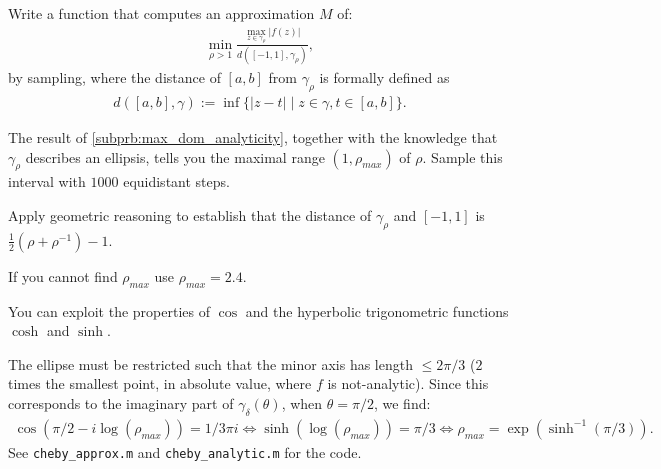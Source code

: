 \begin{problem}
\begin{subproblem}[2] \label{subprb:compute_upper_bound_cheby}
 Write a \Matlab{} function that computes an approximation $M$ of:
 \begin{align}
  \min_{\rho > 1} \frac{ \max_{z \in \gamma_\rho} \lvert f(z) \rvert }{d([-1,1], \gamma_\rho)},
 \end{align}
 by sampling, where the distance of $[a,b]$ from $\gamma_{\rho}$ is formally
 defined as
 \begin{align}
  d([a,b], \gamma) := \inf \{ \lvert z - t \rvert \; | \; z \in \gamma, t \in [a,b] \}.
 \end{align}

 \begin{hint}
  The result of \ref{subprb:max_dom_analyticity}, together with the knowledge that $\gamma_\rho$ describes an ellipsis, tells you the maximal range $(1,\rho_{max})$ of $\rho$. Sample this interval with $1000$ equidistant steps.
 \end{hint}
 
 \begin{hint}
  Apply geometric reasoning to establish that the
  distance of $\gamma_\rho$ and $[-1,1]$ is $\frac{1}{2}(\rho + \rho^{-1}) - 1$.
 \end{hint}
 
 \begin{hint}
  If you cannot find $\rho_{max}$ use $\rho_{max} = 2.4$.
 \end{hint}
 
 \begin{hint}
  You can exploit the properties of $\cos$ and the hyperbolic trigonometric functions $\cosh$ and $\sinh$.
 \end{hint}

\cprotEnv \begin{solution}
  The ellipse must be restricted such that the minor axis has length $\leq 2 \pi / 3$ ($2$ times the smallest point, in absolute value, where $f$ is not-analytic). Since this corresponds to the imaginary part of $\gamma_\delta(\theta)$, when $\theta = \pi / 2$, we find:
  \begin{align*}
   \cos(\pi / 2 - i \log(\rho_{max})) = 1 / 3 \pi i \Leftrightarrow \sinh(\log(\rho_{max})) = \pi/3 \Leftrightarrow \rho_{max} = \exp(\sinh^{-1}(\pi / 3)).
  \end{align*}
  See \verb|cheby_approx.m| and \verb|cheby_analytic.m| for the \Matlab{} code.
 \end{solution}
\end{subproblem}


\end{problem}
